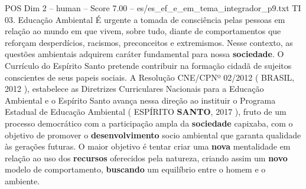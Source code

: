 \begin{textsample}{POS Dim 2 – human – Score 7.00 – es/es\_ef\_e\_em\_tema\_integrador\_p9.txt}  \label{ex:f2_pos_006}
TI 03.
Educação Ambiental É urgente a tomada de consciência pelas pessoas em relação ao mundo em que vivem, sobre tudo, diante de comportamentos que reforçam desperdícios, racismos, preconceitos e extremismos.
Nesse contexto, as questões ambientais adquirem caráter fundamental para nossa \textbf{sociedade}.
O Currículo do Espírito Santo pretende contribuir na formação cidadã de sujeitos conscientes de seus papeis sociais.
A Resolução CNE/CPNº 02/2012 ( BRASIL, 2012 ), estabelece as Diretrizes Curriculares Nacionais para a Educação Ambiental e o Espírito Santo avança nessa direção ao instituir o Programa Estadual de Educação Ambiental ( ESPÍRITO \textbf{SANTO}, 2017 ), fruto de um processo democrático com a participação ampla da \textbf{sociedade} capixaba, com o objetivo de promover o \textbf{desenvolvimento} socio ambiental que garanta qualidade às gerações futuras.
O maior objetivo é tentar criar uma \textbf{nova} mentalidade em relação ao uso dos \textbf{recursos} oferecidos pela natureza, criando assim um \textbf{novo} modelo de comportamento, \textbf{buscando} um equilíbrio entre o homem e o ambiente.

\end{textsample}
